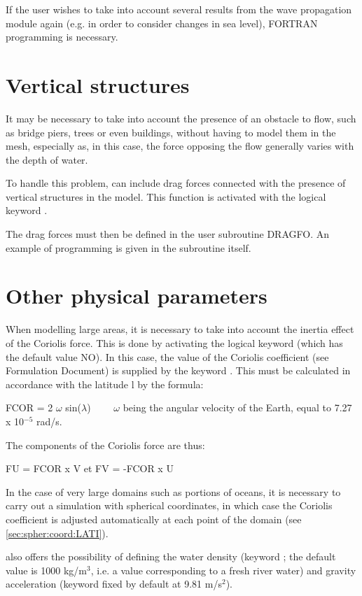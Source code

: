  If the user wishes to take into account several results from the wave propagation module again (e.g. in order to consider changes in sea level), FORTRAN programming is necessary.


\section{ Vertical structures }

 It may be necessary to take into account the presence of an obstacle to flow, such as bridge piers, trees or even buildings, without having to model them in the mesh, especially as, in this case, the force opposing the flow generally varies with the depth of water.

 To handle this problem,  can include drag forces connected with the presence of vertical structures in the model. This function is activated with the logical keyword .

 The drag forces must then be defined in the user subroutine DRAGFO. An example of programming is given in the subroutine itself.


\section{Other physical parameters}

 When modelling large areas, it is necessary to take into account the inertia effect of the Coriolis force. This is done by activating the logical keyword   (which has the default value NO). In this case, the value of the Coriolis coefficient (see Formulation Document) is supplied by the keyword . This must be calculated in accordance with the latitude l by the formula:

 FCOR = 2 $\omega$ sin($\lambda$)          $\qquad \omega$ being the angular velocity of the Earth, equal to 7.27 x 10${}^{-5}$ rad/s.

 The components of the Coriolis force are thus:

 FU = FCOR x V         et         FV = -FCOR x U

 In the case of very large domains such as portions of oceans, it is necessary to carry out a simulation with spherical coordinates, in which case the Coriolis coefficient is adjusted automatically at each point of the domain (see \ref{sec:spher:coord:LATI}).

  also offers the possibility of defining the water density (keyword  ; the default value is 1000 kg/m${}^{3}$, i.e. a value corresponding to a fresh river water) and gravity acceleration (keyword   fixed by default at 9.81 m/s${}^{2}$).


